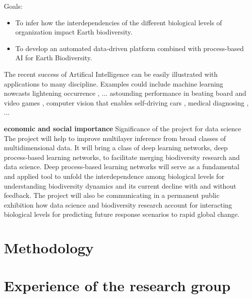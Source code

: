 \documentclass[authoryear,1p,12pt]{elsarticle}
\begin{document}
     Goals:
     \begin{itemize}
     \item To infer how the interdependencies of the different biological levels of organization impact Earth biodiversity.
     \item To develop an automated data-driven platform combined with process-based AI for Earth Biodiversity.
     \end{itemize}

     \cite{Webb2018,Heaven2019} The recent  success of Artifical Intelligence can be easily illustrated with applications to many discipline. Examples could include machine learning nowcasts lightening occurrence \cite{Mostajabi2019}, ...  astounding performance in beating board and video games \cite{Mnih2015,Silver2016}, computer vision that enables self-driving cars  \cite{Poggio2004,Krizhevsky2012}, medical diagnosing \cite{Ferrucci2013}, ...

     \newpage
     {\bf economic and social importance}
     Significance of the project for data science
The project will help to improve multilayer inference from broad classes of multidimensional data. It will bring a class of deep learning networks, deep process-based learning networks, to facilitate merging biodiversity research and data science. Deep process-based learning networks will serve as a fundamental and applied tool to unfold the interdependence among biological levels for understanding biodiversity dynamics and its current decline with and without feedback. The project will also be communicating in a permanent public exhibition how data science and biodiversity research account for interacting biological levels for predicting future response scenarios to rapid global change.

      
     \newpage
     \section{Methodology}
     \newpage
     \section{Experience of the research group}
     
\end{document}
